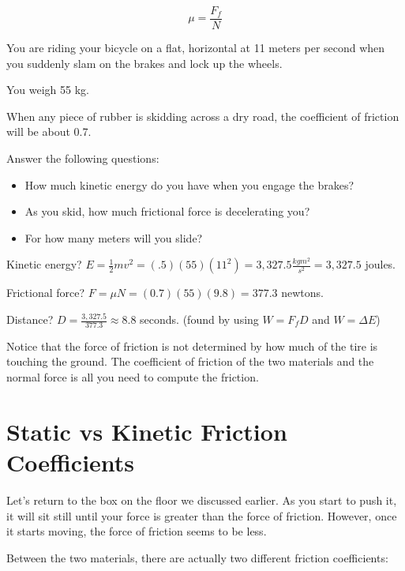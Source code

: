 $$\mu = \frac{F_{f}}{N}$$

\begin{Exercise}[title={Bicycle Stopping},  label=bike_stop]
  
You are riding your bicycle on a flat, horizontal at 11 meters per second when you suddenly slam on the brakes and lock up the wheels.  

You weigh 55 kg.   

When any piece of rubber is skidding across a dry road, the coefficient of friction will be about 0.7.

Answer the following questions: 

\begin{itemize}
\item How much kinetic energy do you have when you engage the brakes?
\item As you skid,  how much frictional force is decelerating you?
\item For how many meters will you slide?
\end{itemize}

\end{Exercise}
\begin{Answer}[ref=bike_stop]

Kinetic energy? $E = \frac{1}{2}mv^2 = (.5)(55)(11^2) = 3,327.5 \frac{kg m^2}{s^2} = 3,327.5$ joules.

Frictional force? $F = \mu N = (0.7)(55)(9.8) = 377.3$ newtons.

Distance?  $D = \frac{3,327.5}{377.3} \approx 8.8$ seconds. (found by using $W = F_f D$ and $W = \Delta E$)

\end{Answer}

Notice that the force of friction is not determined by how much of the tire is touching the ground. The coefficient of friction of the two materials and the normal force is all you need to compute the friction.
\section{Static vs Kinetic Friction Coefficients}

Let's return to the box on the floor we discussed earlier. As you start to push it, it will sit still until your force is greater than the force of friction.   However, once it starts moving,  the force of friction seems to be less.

Between the two materials,  there are actually two different friction coefficients:

